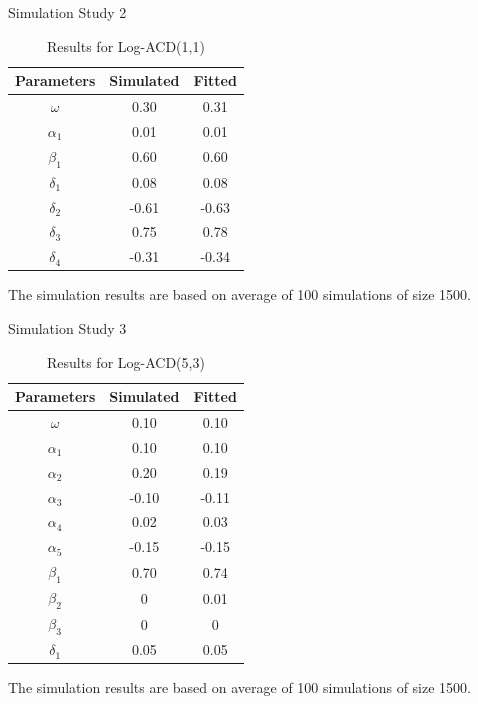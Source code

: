 \documentclass[
  ignorenonframetext,
]{beamer}
\begin{document}
\begin{frame}{Simulation Study 2}
\protect\hypertarget{simulation-study-2}{}
\begin{table}[ht]
\caption{Results for Log-ACD(1,1)}
\begin{tabular}{|c|c|c|}
 \hline
 Parameters& Simulated & Fitted \\
 \hline
 $\omega$   & 0.30 & 0.31  \\
 $\alpha_1$   & 0.01 & 0.01  \\
 $\beta_1$  & 0.60 & 0.60  \\
 $\delta_1$   & 0.08 & 0.08  \\
 $\delta_2$   & -0.61 & -0.63  \\
 $\delta_3$   & 0.75 & 0.78   \\
 $\delta_4$   & -0.31 & -0.34 \\
 \hline
\end{tabular}
\end{table}

The simulation results are based on average of 100 simulations of size
1500.
\end{frame}

\begin{frame}{Simulation Study 3}
\protect\hypertarget{simulation-study-3}{}
\begin{table}[ht]
\caption{Results for Log-ACD(5,3)}
\begin{tabular}{|c|c|c|}
 \hline
 Parameters& Simulated & Fitted \\
 \hline
 $\omega$   & 0.10 & 0.10  \\
 $\alpha_1$   & 0.10 & 0.10  \\
 $\alpha_2$  & 0.20 & 0.19  \\
 $\alpha_3$   & -0.10 & -0.11  \\
 $\alpha_4$   & 0.02 & 0.03  \\
 $\alpha_5$   & -0.15 & -0.15   \\
 $\beta_1$   & 0.70 & 0.74 \\
 $\beta_2$   & 0 & 0.01 \\
 $\beta_3$   & 0 & 0 \\
 $\delta_1$   & 0.05 & 0.05 \\
 \hline
\end{tabular}
\end{table}

The simulation results are based on average of 100 simulations of size
1500.
\end{frame}
\end{document}

